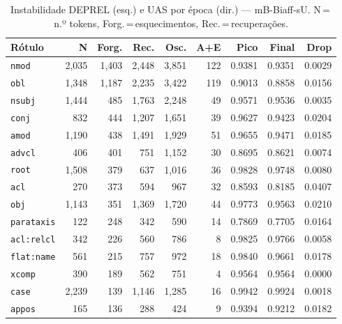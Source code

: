 

\begin{table}[ht]
\centering
\caption{Instabilidade DEPREL (esq.) e UAS por época (dir.) --- mB-Biaff-sU. N\,=\,n.º tokens, Forg.\,=\,esquecimentos, Rec.\,=\,recuperações.}
\label{tab:inst-bert-base-multilingual-cased-predictions-ablacao-biaffine}
\begin{minipage}[t]{0.54\linewidth}
\centering\tiny
\begin{tabular}{lrrrrrrrr}
\toprule
\textbf{Rótulo} & \textbf{N} & \textbf{Forg.} & \textbf{Rec.} & \textbf{Osc.} & \textbf{A+E} & \textbf{Pico} & \textbf{Final} & \textbf{Drop} \\
\midrule
\texttt{nmod} & 2,035 & 1,403 & 2,448 & 3,851 & 122 & 0.9381 & 0.9351 & 0.0029 \\
\texttt{obl} & 1,348 & 1,187 & 2,235 & 3,422 & 119 & 0.9013 & 0.8858 & 0.0156 \\
\texttt{nsubj} & 1,444 & 485 & 1,763 & 2,248 & 49 & 0.9571 & 0.9536 & 0.0035 \\
\texttt{conj} & 832 & 444 & 1,207 & 1,651 & 39 & 0.9627 & 0.9423 & 0.0204 \\
\texttt{amod} & 1,190 & 438 & 1,491 & 1,929 & 51 & 0.9655 & 0.9471 & 0.0185 \\
\texttt{advcl} & 406 & 401 & 751 & 1,152 & 30 & 0.8695 & 0.8621 & 0.0074 \\
\texttt{root} & 1,508 & 379 & 637 & 1,016 & 36 & 0.9828 & 0.9748 & 0.0080 \\
\texttt{acl} & 270 & 373 & 594 & 967 & 32 & 0.8593 & 0.8185 & 0.0407 \\
\texttt{obj} & 1,143 & 351 & 1,369 & 1,720 & 44 & 0.9773 & 0.9563 & 0.0210 \\
\texttt{parataxis} & 122 & 248 & 342 & 590 & 14 & 0.7869 & 0.7705 & 0.0164 \\
\texttt{acl\!:\!relcl} & 342 & 226 & 560 & 786 & 8 & 0.9825 & 0.9766 & 0.0058 \\
\texttt{flat\!:\!name} & 561 & 215 & 757 & 972 & 18 & 0.9840 & 0.9661 & 0.0178 \\
\texttt{xcomp} & 390 & 189 & 562 & 751 & 4 & 0.9564 & 0.9564 & 0.0000 \\
\texttt{case} & 2,239 & 139 & 1,146 & 1,285 & 16 & 0.9942 & 0.9924 & 0.0018 \\
\texttt{appos} & 165 & 136 & 288 & 424 & 9 & 0.9394 & 0.9212 & 0.0182 \\
\bottomrule
\end{tabular}
\end{minipage}

\end{table}
